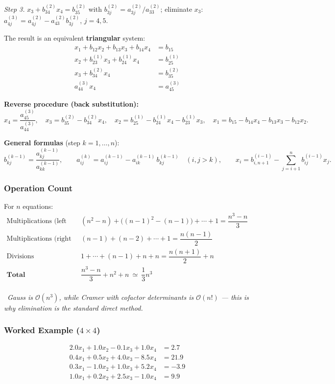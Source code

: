 \documentclass[hidelinks]{article}
\newcommand{\callout}[1]{\par\smallskip\noindent{\color{capri}$\blacktriangleright$}\ \textit{#1}\par\smallskip}
\begin{document}
\emph{Step 3.} $x_3+b^{(2)}_{34}x_4=b^{(2)}_{35}$ with $b^{(2)}_{3j}=a^{(2)}_{3j}/a^{(2)}_{33}$; eliminate $x_3$: $a^{(3)}_{4j}=a^{(2)}_{4j}-a^{(2)}_{43}b^{(2)}_{3j}$, $j=4,5$.

The result is an equivalent \textbf{triangular} system:
\[
\begin{aligned}
x_1+b_{12}x_2+b_{13}x_3+b_{14}x_4&=b_{15}\\
x_2+b^{(1)}_{23}x_3+b^{(1)}_{24}x_4&=b^{(1)}_{25}\\
x_3+b^{(2)}_{34}x_4&=b^{(2)}_{35}\\
a^{(3)}_{44}x_4&=a^{(3)}_{45}
\end{aligned}
\]

\textbf{Reverse procedure (back substitution):}
\[
x_4=\frac{a^{(3)}_{45}}{a^{(3)}_{44}},\quad
x_3=b^{(2)}_{35}-b^{(2)}_{34}x_4,\quad
x_2=b^{(1)}_{25}-b^{(1)}_{24}x_4-b^{(1)}_{23}x_3,\quad
x_1=b_{15}-b_{14}x_4-b_{13}x_3-b_{12}x_2 .
\]

\textbf{General formulas} (step $k=1,\dots,n$):
\[
b^{(k-1)}_{kj}=\frac{a^{(k-1)}_{kj}}{a^{(k-1)}_{kk}},\qquad
a^{(k)}_{ij}=a^{(k-1)}_{ij}-a^{(k-1)}_{ik}\,b^{(k-1)}_{kj}\quad(i,j>k),\qquad
x_i=b^{(i-1)}_{i,n+1}-\sum_{j=i+1}^{n}b^{(i-1)}_{ij}x_j .
\]

\subsubsection{Operation Count}

For $n$ equations:
\[
\begin{array}{ll}
\text{Multiplications (left side)} & (n^2-n)+\big((n-1)^2-(n-1)\big)+\cdots+1=\dfrac{n^3-n}{3}\\[6pt]
\text{Multiplications (right side)} & (n-1)+(n-2)+\cdots+1=\dfrac{n(n-1)}{2}\\[6pt]
\text{Divisions} & 1+\cdots+(n-1)+n+n=\dfrac{n(n+1)}{2}+n\\[6pt]
\textbf{Total} & \dfrac{n^3-n}{3}+n^2+n\ \simeq\ \dfrac13n^3\\
\end{array}
\]
\callout{Gauss is $\mathcal O(n^3)$, while Cramer with cofactor determinants is $\mathcal O(n!)$ --- this is why elimination is the standard direct method.}

\subsubsection{Worked Example ($4\times4$)}

\[
\begin{aligned}
2.0x_1+1.0x_2-0.1x_3+1.0x_4&=2.7\\
0.4x_1+0.5x_2+4.0x_3-8.5x_4&=21.9\\
0.3x_1-1.0x_2+1.0x_3+5.2x_4&=-3.9\\
1.0x_1+0.2x_2+2.5x_3-1.0x_4&=9.9
\end{aligned}
\]
\end{document}
